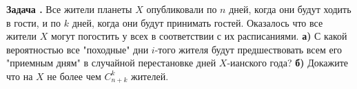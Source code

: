 \documentclass[11pt,a4paper]{article}
\newcounter{znum}
\newcommand{\z}[1]{\addtocounter{znum}{1} \textbf{Задача \arabic{znum}#1. }}
\renewcommand{\!}{\textcolor{red}{!}}
\begin{document}
\z{} Все жители планеты $X$ опубликовали по $n$ дней, когда они будут ходить в гости, и по $k$ дней, когда они будут принимать гостей. Оказалось что все жители $X$ могут погостить у всех в соответствии с их расписаниями.
\textbf{а)} С какой вероятностью все "походные" дни $i$-того жителя будут предшествовать всем его "приемным дням" в случайной перестановке дней $X$-ианского года?
\textbf{б)} Докажите что на $X$ не более чем $C_{n+k}^k$ жителей.
\end{document}
